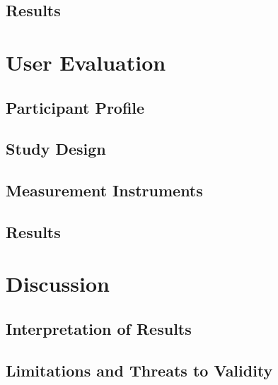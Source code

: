 
\subsection{Results}
\label{subsec:eval-system-results}


\section{User Evaluation}
\label{sec:eval-user}

\subsection{Participant Profile}
\label{subsec:eval-participants}


\subsection{Study Design}
\label{subsec:eval-study-design}


\subsection{Measurement Instruments}
\label{subsec:eval-instruments}


\subsection{Results}
\label{subsec:eval-user-results}


\section{Discussion}
\label{sec:eval-discussion}

\subsection{Interpretation of Results}
\label{subsec:eval-interpretation}


\subsection{Limitations and Threats to Validity}
\label{subsec:eval-limitations}

